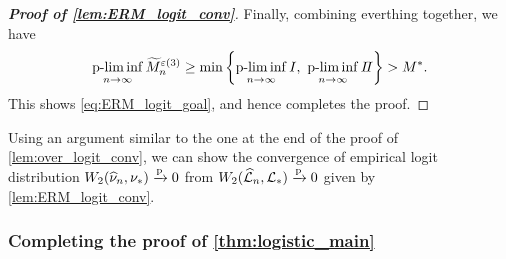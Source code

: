 \begin{proof}[\textbf{Proof of \cref{lem:ERM_logit_conv}}]
Finally, combining everthing together, we have
\begin{equation*}
    \operatorname*{p-lim\, inf}_{n \to \infty} \widetilde M_n^{\varepsilon(3)}
    \ge \min\left\{ \operatorname*{p-lim\, inf}_{n \to \infty} I, \ \operatorname*{p-lim\, inf}_{n \to \infty} I\!I \right\}
    > M^*.
\end{equation*}
This shows \cref{eq:ERM_logit_goal}, and hence completes the proof.
\end{proof}

Using an argument similar to the one at the end of the proof of \cref{lem:over_logit_conv}, we can show the convergence of empirical logit distribution $W_2 ( \widehat \nu_{n}, \nu_* ) \xrightarrow{\mathrm{p}} 0$ from $W_2( \widehat {\mathcal{L}}_{n}, \mathcal{L}_* ) \xrightarrow{\mathrm{p}} 0$ given by \cref{lem:ERM_logit_conv}.

\subsubsection{Completing the proof of \cref{thm:logistic_main}}
\label{subsubsec:under_final}

